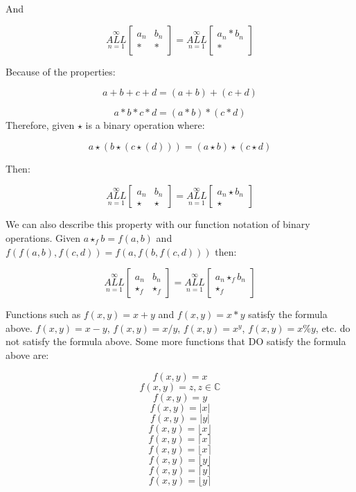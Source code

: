 \documentclass{article}
\begin{document}
And

$$\underset{n=1}{\overset{\infty}{ALL}} \begin{bmatrix}
a_n & b_n \\
*& *
\end{bmatrix} = \underset{n=1}{\overset{\infty}{ALL}} \begin{bmatrix}
a_n * b_n \\
 *
\end{bmatrix}$$

Because of the properties:

$$a+b+c+d=(a+b)+(c+d)$$

$$a*b*c*d=(a*b)*(c*d)$$
Therefore, given $\star$ is a binary operation where:

$$a\star(b\star(c\star(d)))=(a \star b) \star (c \star d)$$ 

Then:

$$\underset{n=1}{\overset{\infty}{ALL}} \begin{bmatrix}
a_n & b_n \\
\star & \star
\end{bmatrix} = \underset{n=1}{\overset{\infty}{ALL}} \begin{bmatrix}
a_n \star b_n \\
 \star
\end{bmatrix}$$

We can also describe this property with our function notation of binary operations. Given $a\star_fb=f(a,b)$ and $f(f(a,b),f(c,d))=f(a,f(b,f(c,d)))$ then:

$$\underset{n=1}{\overset{\infty}{ALL}} \begin{bmatrix}
a_n & b_n \\
\star_f & \star_f
\end{bmatrix} = \underset{n=1}{\overset{\infty}{ALL}} \begin{bmatrix}
a_n \star_f b_n \\
 \star_f
\end{bmatrix}$$

Functions such as $f(x,y)=x+y$ and $f(x,y)=x*y$ satisfy the formula above. $f(x,y)=x-y$, $f(x,y)=x/y$, $f(x,y)=x^y$, $f(x,y)=x\%y$, etc. do not satisfy the formula above. Some more functions that DO satisfy the formula above are:

$$f(x,y)=x$$
$$f(x,y)=z, z\in\mathbb{C}$$ 
$$f(x,y)=y$$ 
$$f(x,y)=|x|$$ 
$$f(x,y)=|y|$$ 
$$f(x,y)=\lfloor x \rfloor$$ 
$$f(x,y)=\lceil x \rceil$$
$$f(x,y)=\lfloor x \rceil$$
$$f(x,y)=\lfloor y \rfloor$$ 
$$f(x,y)=\lceil y \rceil$$
$$f(x,y)=\lfloor y \rceil$$
\end{document}
